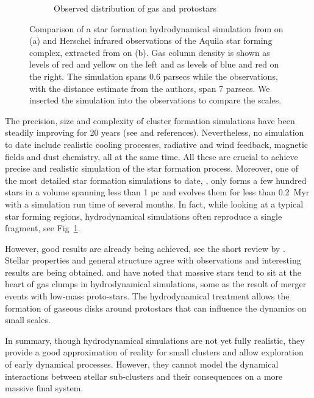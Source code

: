 \begin{figure}
\begin{subfigure}[b]{0.48\textwidth}
        \caption{Observed distribution of gas and protostars}
        \label{Fig:0_aquila_bate2012}
    \end{subfigure}
\caption[Hydrodynamical simulation of a star forming clump scaled to infrared observations]{Comparison of a star formation hydrodynamical simulation from \cite{Bate2012}  on (a) and Herschel infrared observations of the Aquila star forming complex, extracted from \cite{Konyves2010} on (b). Gas column density is shown as levels of red and yellow on the left and as levels of blue and red on the right. The simulation spans 0.6 parsecs while the observations, with the distance estimate from the authors, span 7 parsecs. We inserted the simulation into the observations to compare the scales.}
\label{Fig:0_clumps}
\end{figure}



The precision, size and complexity of cluster formation simulations have been steadily improving for 20 years (see \citealt{Turner1995,Klessen2000,Bate2003,Offner2009,Myers2014} and references). Nevertheless, no simulation to date include realistic cooling processes, radiative and wind feedback, magnetic fields and dust chemistry, all at the same time. All these are crucial to achieve precise and realistic simulation of the star formation process. Moreover, one of the most detailed star formation simulations to date, \cite{Bate2012}, only forms a few hundred stars in a volume spanning less than 1 pc and evolves them for less than 0.2~Myr with a simulation run time of several months. In fact, while looking at a typical star forming regions, hydrodynamical simulations often reproduce a single fragment, see Fig~\ref{Fig:0_aquila_bate2012}.

However, good results are already being achieved, see the short review by \cite{Clarke2012}. Stellar properties and general structure agree with observations and interesting results are being obtained. \cite{Maschberger2011} and \cite{Moeckel2011} have noted that massive stars tend to sit at the heart of gas clumps in hydrodynamical simulations, some as the result of merger events with low-mass proto-stars. The hydrodynamical treatment allows the formation of gaseous disks around protostars that can influence the dynamics on small scales.

In summary, though hydrodynamical simulations are not yet fully realistic, they provide a good approximation of reality for small clusters and allow exploration of early dynamical processes. However, they cannot model the dynamical interactions between stellar sub-clusters and their consequences on a more massive final system.


